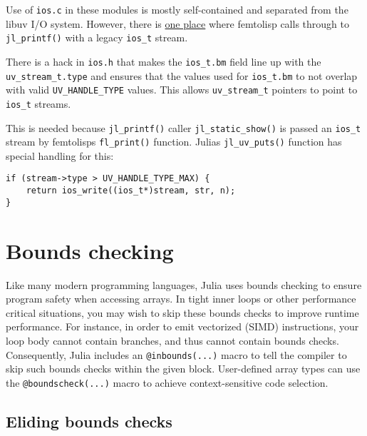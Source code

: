Use of \texttt{ios.c} in these modules is mostly self-contained and separated from the libuv I/O system. However, there is \href{https://github.com/JuliaLang/julia/blob/master/src/flisp/print.c\#L654}{one place} where femtolisp calls through to \texttt{jl\_printf()} with a legacy \texttt{ios\_t} stream.



There is a hack in \texttt{ios.h} that makes the \texttt{ios\_t.bm} field line up with the \texttt{uv\_stream\_t.type} and ensures that the values used for \texttt{ios\_t.bm} to not overlap with valid \texttt{UV\_HANDLE\_TYPE} values.  This allows \texttt{uv\_stream\_t} pointers to point to \texttt{ios\_t} streams.



This is needed because \texttt{jl\_printf()} caller \texttt{jl\_static\_show()} is passed an \texttt{ios\_t} stream by femtolisp{\textquotesingle}s \texttt{fl\_print()} function. Julia{\textquotesingle}s \texttt{jl\_uv\_puts()} function has special handling for this:




\begin{lstlisting}
if (stream->type > UV_HANDLE_TYPE_MAX) {
    return ios_write((ios_t*)stream, str, n);
}
\end{lstlisting}



\hypertarget{1119183925675693738}{}


\section{Bounds checking}



Like many modern programming languages, Julia uses bounds checking to ensure program safety when accessing arrays. In tight inner loops or other performance critical situations, you may wish to skip these bounds checks to improve runtime performance. For instance, in order to emit vectorized (SIMD) instructions, your loop body cannot contain branches, and thus cannot contain bounds checks. Consequently, Julia includes an \texttt{@inbounds(...)} macro to tell the compiler to skip such bounds checks within the given block. User-defined array types can use the \texttt{@boundscheck(...)} macro to achieve context-sensitive code selection.



\hypertarget{15977328606651213476}{}


\subsection{Eliding bounds checks}



